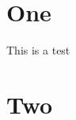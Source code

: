 \documentclass{article}
\begin{document}
\section{One}
This is a test 
\section{Two}
\printindex
\end{document}
